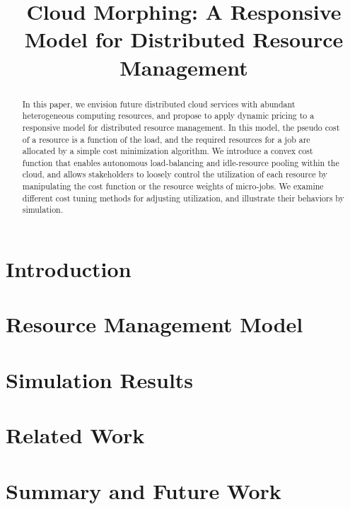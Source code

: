 \documentclass[10pt,sigconf,letterpaper,anonymous,nonacm]{acmart}
\title{Cloud Morphing: A Responsive Model for Distributed Resource Management}
\begin{document}
\begin{abstract}

    In this paper, we envision future distributed cloud services with
    abundant heterogeneous computing resources,
    and propose to apply dynamic pricing to a responsive model for
    distributed resource management.
    In this model, the pseudo cost of a resource is a function of the
    load, and the required resources for a job are allocated by a simple
    cost minimization algorithm.
    We introduce a convex cost function that enables autonomous
    load-balancing and idle-resource pooling within the cloud, and allows
    stakeholders to loosely control the utilization of each resource by
    manipulating the cost function or the resource weights of micro-jobs.
    We examine different cost tuning methods for adjusting
    utilization, and illustrate their behaviors by simulation.

\end{abstract}

\maketitle

\section{Introduction}



\section{Resource Management Model}



\section{Simulation Results}



\section{Related Work}



\section{Summary and Future Work}





\end{document}
